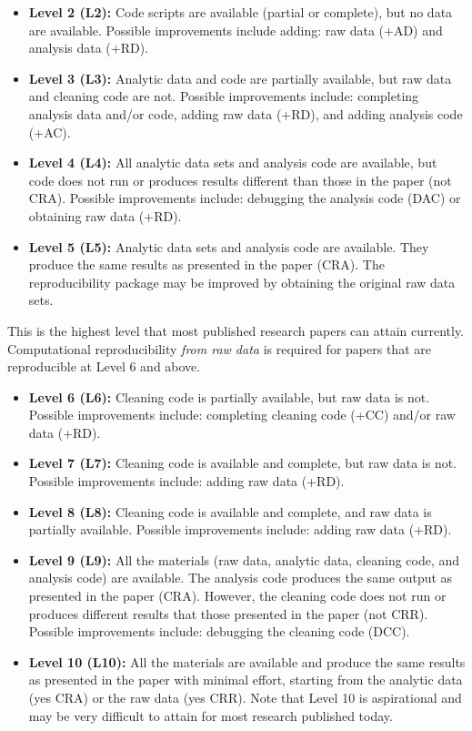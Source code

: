 \documentclass[]{book}
\begin{document}
\begin{itemize}
\item
  \textbf{Level 2 (L2):} Code scripts are available (partial or complete), but no data are available. Possible improvements include adding: raw data (+AD) and analysis data (+RD).
\item
  \textbf{Level 3 (L3):} Analytic data and code are partially available, but raw data and cleaning code are not. Possible improvements include: completing analysis data and/or code, adding raw data (+RD), and adding analysis code (+AC).
\item
  \textbf{Level 4 (L4):} All analytic data sets and analysis code are available, but code does not run or produces results different than those in the paper (not CRA). Possible improvements include: debugging the analysis code (DAC) or obtaining raw data (+RD).
\item
  \textbf{Level 5 (L5):} Analytic data sets and analysis code are available. They produce the same results as presented in the paper (CRA). The reproducibility package may be improved by obtaining the original raw data sets.
\end{itemize}

This is the highest level that most published research papers can attain currently. Computational reproducibility \emph{from raw data} is required for papers that are reproducible at Level 6 and above.

\begin{itemize}
\item
  \textbf{Level 6 (L6):} Cleaning code is partially available, but raw data is not. Possible improvements include: completing cleaning code (+CC) and/or raw data (+RD).
\item
  \textbf{Level 7 (L7):} Cleaning code is available and complete, but raw data is not. Possible improvements include: adding raw data (+RD).
\item
  \textbf{Level 8 (L8):} Cleaning code is available and complete, and raw data is partially available. Possible improvements include: adding raw data (+RD).
\item
  \textbf{Level 9 (L9):} All the materials (raw data, analytic data, cleaning code, and analysis code) are available. The analysis code produces the same output as presented in the paper (CRA). However, the cleaning code does not run or produces different results that those presented in the paper (not CRR). Possible improvements include: debugging the cleaning code (DCC).
\item
  \textbf{Level 10 (L10):} All the materials are available and produce the same results as presented in the paper with minimal effort, starting from the analytic data (yes CRA) or the raw data (yes CRR). Note that Level 10 is aspirational and may be very difficult to attain for most research published today.
\end{itemize}
\end{document}
